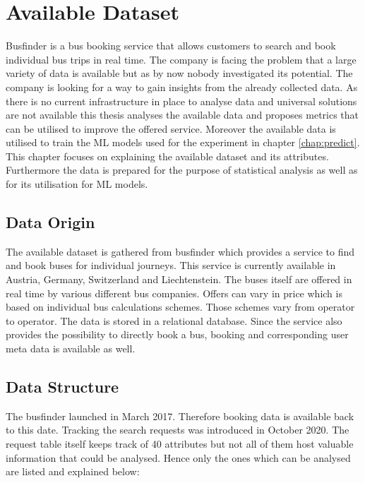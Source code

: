 %
%
% 
% 
% 

\chapter{Available Dataset}
\label{chap:available_dataset}
Busfinder is a bus booking service that allows customers to search and book individual bus trips in real time. The company is facing the problem that a large variety of data is available but as by now nobody investigated its potential. The company is looking for a way to gain insights from the already collected data. As there is no current infrastructure in place to analyse data and universal solutions are not available this thesis analyses the available data and proposes metrics that can be utilised to improve the offered service. Moreover the available data is utilised to train the ML models used for the experiment in chapter \ref{chap:predict}. This chapter focuses on explaining the available dataset and its attributes. Furthermore the data is prepared for the purpose of statistical analysis as well as for its utilisation for ML models.

\section{Data Origin}
The available dataset is gathered from busfinder which provides a service to find and book buses for individual journeys. This service is currently available in Austria, Germany, Switzerland and Liechtenstein. The buses itself are offered in real time by various different bus companies. Offers can vary in price which is based on individual bus calculations schemes. Those schemes vary from operator to operator. The data is stored in a relational database. Since the service also provides the possibility to directly book a bus, booking and corresponding user meta data is available as well. \newline

\section{Data Structure}
The busfinder launched in March 2017. Therefore booking data is available back to this date. Tracking the search requests was introduced in October 2020. 
The request table itself keeps track of 40 attributes but not all of them host valuable information that could be analysed. Hence only the ones which can be analysed are listed and explained below:

